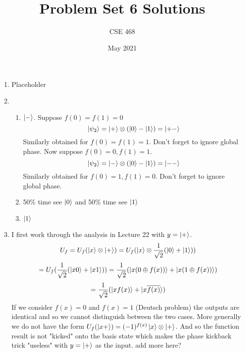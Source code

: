 \documentclass[12pt]{article}
\title{Problem Set 6 Solutions}
\author{CSE 468}
\date{May 2021}
\begin{document}
\maketitle

\begin{enumerate}[font=\bfseries]
    \item Placeholder
    \item \begin{enumerate}
        \item $\ket{-}$. Suppose $f(0) = f(1) = 0$
        \[\ket{\psi_2} = \ket{+} \otimes (\ket{0} - \ket{1}) = \ket{+-}\]
        Similarly obtained for $f(0) = f(1) = 1$. Don't forget to ignore global phase.
        Now suppose $f(0) = 0, f(1) = 1$.
        \[\ket{\psi_2} = \ket{-} \otimes (\ket{0} - \ket{1}) = \ket{--}\]
        Similarly obtained for $f(0) = 1, f(1) = 0$. Don't forget to ignore global phase.
        \item 50\% time see $\ket{0}$ and 50\% time see $\ket{1}$
        \item $\ket{1}$
    \end{enumerate}
    \item I first work through the analysis in Lecture 22 with $y=\ket{+}$.
    \[U_f = U_f(\ket{x}\otimes\ket{+}) = U_f(\ket{x}\otimes\frac{1}{\sqrt{2}}(\ket{0}+\ket{1}))\]
    \[=U_f(\frac{1}{\sqrt{2}}(\ket{x0}+\ket{x1})) = 
    \frac{1}{\sqrt{2}}(\ket{x(0\oplus f(x))}+ \ket{x(1\oplus f(x))})\]
    \[= \frac{1}{\sqrt{2}}(\ket{xf(x)}+\ket{x\overline{f(x)}})\]
    If we consider $f(x) = 0$ and $f(x) = 1$ (Deutsch problem) the outputs are identical and so we cannot distinguish between the two cases. More generally we do not have the form $U_f(\ket{x+}) = (-1)^{f(x)} \ket{x} \otimes \ket{+}$. And so the function result is not "kicked" onto the basis state which makes the phase kickback trick "useless" with $y = \ket{+}$ as the input. add more here?
\end{enumerate}
\end{document}
